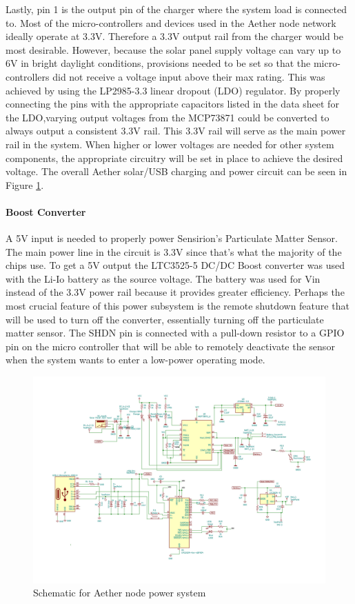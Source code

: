 Lastly, pin 1 is the output pin of the charger where the system load is connected to. Most of the micro-controllers and devices used in the Aether node network ideally operate at 3.3V. Therefore a 3.3V output rail from the charger would be most desirable. However, because the solar panel supply voltage can vary up to 6V in bright daylight conditions, provisions needed to be set so that the micro-controllers did not receive a voltage input above their max rating. This was achieved by using the LP2985-3.3 linear dropout (LDO) regulator. By properly connecting the pins with the appropriate capacitors listed in the data sheet for the LDO,varying output voltages from the MCP73871 could be converted to always output a consistent 3.3V rail. This 3.3V rail will serve as the main power rail in the system. When higher or lower voltages are needed for other system components, the appropriate circuitry will be set in place to achieve the desired voltage. The overall Aether solar/USB charging and power circuit can be seen in Figure \ref{fig:power_schematic}.

\paragraph{Boost Converter}
A 5V input is needed to properly power Sensirion's Particulate Matter Sensor. The main power line in the circuit is 3.3V since that's what the majority of the chips use. To get a 5V output the LTC3525-5 DC/DC Boost converter was used with the Li-Io battery as the source voltage. The battery was used for Vin instead of the 3.3V power rail because it provides greater efficiency. Perhaps the most crucial feature of this power subsystem is the remote shutdown feature that will be used to turn off the converter, essentially turning off the particulate matter sensor. The SHDN pin is connected with a pull-down resistor to a GPIO pin on the micro controller that will be able to remotely deactivate the sensor when the system wants to enter a low-power operating mode. 

\begin{figure}
    \centering
    \includegraphics[scale=0.75]{figures/Power Schematic.jpg}
    \caption{Schematic for Aether node power system}
    \label{fig:power_schematic} 
\end{figure}

